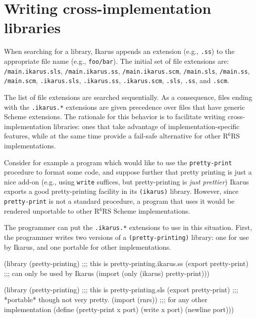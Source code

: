 \documentclass[onecolumn, 12pt, twoside, openright, dvipdfm]{book}
\newcommand{\rnrs}[1]{R$^{\mathrm{#1}}$RS}
\begin{document}
\section{Writing cross-implementation libraries}

When searching for a library, Ikarus appends an extension (e.g.,
\verb|.ss|) to the appropriate file name (e.g., \verb|foo/bar|).
The initial set of file extensions are: \\
\verb|/main.ikarus.sls|,
\verb|/main.ikarus.ss|, \verb|/main.ikarus.scm|,
\verb|/main.sls|, \verb|/main.ss|, \verb|/main.scm|,
\verb|.ikarus.sls|,
\verb|.ikarus.ss|, \verb|.ikarus.scm|,
\verb|.sls|, \verb|.ss|, and \verb|.scm|.

The list of file extensions are searched sequentially.  As a
consequence, files ending with the \verb|.ikarus.*| extensions are
given precedence over files that have generic Scheme extensions.
The rationale for this behavior is to facilitate writing
cross-implementation libraries: ones that take advantage of
implementation-specific features, while at the same time 
provide a fail-safe alternative for other \rnrs{6}
implementations.

Consider for example a program which would like to use the
\verb|pretty-print| procedure to format some code, and suppose
further that pretty printing is just a nice add-on (e.g., using
\verb|write| suffices, but pretty-printing is \emph{just prettier})
Ikarus exports a good pretty-printing facility in its
\verb|(ikarus)| library.  However, since \verb|pretty-print| is not
a standard procedure, a program that uses it would be rendered
unportable to other \rnrs{6} Scheme implementations.  

The programmer can put the \verb|.ikarus.*| extensions to use in
this situation.  First, the programmer writes two versions of a
\verb|(pretty-printing)| library: one for use by Ikarus, and one
portable for other implementations.

\begin{CodeInline}
(library (pretty-printing) ;;; this is pretty-printing.ikarus.ss
  (export pretty-print)    ;;; can only be used by Ikarus
  (import (only (ikarus) pretty-print)))
\end{CodeInline}

\begin{CodeInline}
(library (pretty-printing) ;;; this is pretty-printing.sls
  (export pretty-print)    ;;; *portable* though not very pretty.
  (import (rnrs))          ;;; for any other implementation
  (define (pretty-print x port)
    (write x port)
    (newline port)))
\end{CodeInline}
\end{document}
